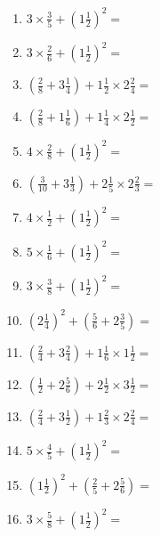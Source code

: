 \documentclass[12pt]{article}
\begin{document}
\begin{enumerate}
\item \large $ 3 \times \frac{3}{5} + (1 \frac{1}{2})^2 = $ \vspace{1.8cm}
\item \large $ 3 \times \frac{2}{6} + (1 \frac{1}{2})^2 = $ \vspace{1.8cm}
\item \large $ (\frac{2}{8} + 3 \frac{1}{4}) + 1 \frac{1}{2} \times 2 \frac{2}{4} = $ \vspace{1.8cm}
\item \large $ (\frac{2}{8} + 1 \frac{1}{6}) + 1 \frac{1}{4} \times 2 \frac{1}{2} = $ \vspace{1.8cm}
\item \large $ 4 \times \frac{2}{8} + (1 \frac{1}{2})^2 = $ \vspace{1.8cm}
\item \large $ (\frac{3}{10} + 3 \frac{1}{3}) + 2 \frac{1}{5} \times 2 \frac{2}{3} = $ \vspace{1.8cm}
\newpage
\item \large $ 4 \times \frac{1}{2} + (1 \frac{1}{2})^2 = $ \vspace{1.8cm}
\item \large $ 5 \times \frac{1}{6} + (1 \frac{1}{2})^2 = $ \vspace{1.8cm}
\item \large $ 3 \times \frac{3}{8} + (1 \frac{1}{2})^2 = $ \vspace{1.8cm}
\item \large $ (2 \frac{1}{4})^2 + (\frac{5}{6} + 2 \frac{3}{5}) = $ \vspace{1.8cm}
\item \large $ (\frac{2}{4} + 3 \frac{2}{4}) + 1 \frac{1}{6} \times 1 \frac{1}{2} = $ \vspace{1.8cm}
\item \large $ (\frac{1}{2} + 2 \frac{5}{6}) + 2 \frac{1}{2} \times 3 \frac{1}{2} = $ \vspace{1.8cm}
\item \large $ (\frac{2}{4} + 3 \frac{1}{2}) + 1 \frac{2}{3} \times 2 \frac{2}{4} = $ \vspace{1.8cm}
\item \large $ 5 \times \frac{4}{5} + (1 \frac{1}{2})^2 = $ \vspace{1.8cm}
\item \large $ (1 \frac{1}{2})^2 + (\frac{2}{5} + 2 \frac{5}{6}) = $ \vspace{1.8cm}
\item \large $ 3 \times \frac{5}{8} + (1 \frac{1}{2})^2 = $ \vspace{1.8cm}

\end{enumerate}
\end{document}
